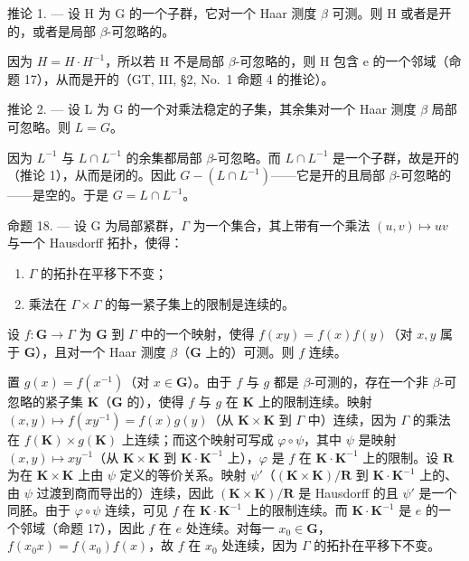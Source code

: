 推论 1. --- 设 H 为 G 的一个子群，它对一个 Haar 测度 \(\beta\) 可测。则 H 或者是开的，或者是局部 \(\beta\)-可忽略的。

因为 \(H = H \cdot H^{-1}\)，所以若 H 不是局部 \(\beta\)-可忽略的，则 H 包含 e 的一个邻域（命题 17），从而是开的（GT, III, §2, No.~1 命题 4 的推论）。

推论 2. --- 设 L 为 G 的一个对乘法稳定的子集，其余集对一个 Haar 测度 \(\beta\) 局部可忽略。则 \(L = G\)。

因为 \(L^{-1}\) 与 \(L \cap L^{-1}\) 的余集都局部 \(\beta\)-可忽略。而 \(L \cap L^{-1}\) 是一个子群，故是开的（推论 1），从而是闭的。因此 \(G - (L \cap L^{-1})\)——它是开的且局部 \(\beta\)-可忽略的——是空的。于是 \(G = L \cap L^{-1}\)。

命题 18. --- 设 G 为局部紧群，\(\Gamma\) 为一个集合，其上带有一个乘法 \((u,v)\mapsto uv\) 与一个 Hausdorff 拓扑，使得：

\begin{enumerate}
\def\labelenumi{\arabic{enumi})}
\item
  \(\Gamma\) 的拓扑在平移下不变；
\item
  乘法在 \(\Gamma \times \Gamma\) 的每一紧子集上的限制是连续的。
\end{enumerate}

设 \(f: \mathbf{G} \to \Gamma\) 为 \(\mathbf{G}\) 到 \(\Gamma\) 中的一个映射，使得 \(f(xy) = f(x)f(y)\)（对 \(x, y\) 属于 \(\mathbf{G}\)），且对一个 Haar 测度 \(\beta\)（\(\mathbf{G}\) 上的）可测。则 \(f\) 连续。

置 \(g(x) = f(x^{-1})\)（对 \(x \in \mathbf{G}\)）。由于 \(f\) 与 \(g\) 都是 \(\beta\)-可测的，存在一个非 \(\beta\)-可忽略的紧子集 \(\mathbf{K}\)（\(\mathbf{G}\) 的），使得 \(f\) 与 \(g\) 在 \(\mathbf{K}\) 上的限制连续。映射 \((x,y) \mapsto f(xy^{-1}) = f(x)g(y)\)（从 \(\mathbf{K} \times \mathbf{K}\) 到 \(\Gamma\) 中）连续，因为 \(\Gamma\) 的乘法在 \(f(\mathbf{K}) \times g(\mathbf{K})\) 上连续；而这个映射可写成 \(\varphi \circ \psi\)，其中 \(\psi\) 是映射 \((x,y) \mapsto xy^{-1}\)（从 \(\mathbf{K} \times \mathbf{K}\) 到 \(\mathbf{K} \cdot \mathbf{K}^{-1}\) 上），\(\varphi\) 是 \(f\) 在 \(\mathbf{K} \cdot \mathbf{K}^{-1}\) 上的限制。设 \(\mathbf{R}\) 为在 \(\mathbf{K} \times \mathbf{K}\) 上由 \(\psi\) 定义的等价关系。映射 \(\psi'\)（\((\mathbf{K} \times \mathbf{K}) / \mathbf{R}\) 到 \(\mathbf{K} \cdot \mathbf{K}^{-1}\) 上的、由 \(\psi\) 过渡到商而导出的）连续，因此 \((\mathbf{K} \times \mathbf{K}) / \mathbf{R}\) 是 Hausdorff 的且 \(\psi'\) 是一个同胚。由于 \(\varphi \circ \psi\) 连续，可见 \(f\) 在 \(\mathbf{K} \cdot \mathbf{K}^{-1}\) 上的限制连续。而 \(\mathbf{K} \cdot \mathbf{K}^{-1}\) 是 \(e\) 的一个邻域（命题 17），因此 \(f\) 在 \(e\) 处连续。对每一 \(x_0 \in \mathbf{G}\)，\(f(x_0x) = f(x_0)f(x)\)，故 \(f\) 在 \(x_0\) 处连续，因为 \(\Gamma\) 的拓扑在平移下不变。

